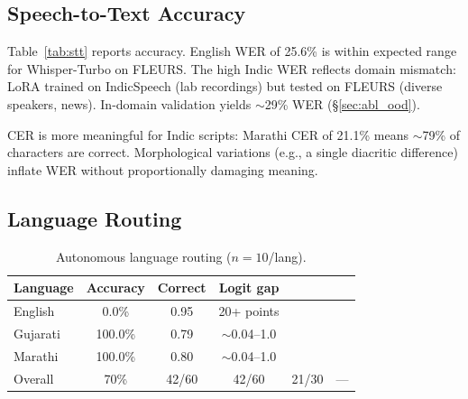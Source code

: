 \documentclass[11pt]{article}
\begin{document}
\subsection{Speech-to-Text Accuracy}

\begin{table}[t]
\centering\small
\caption{STT accuracy on FLEURS ($n{=}50$/language).}
\label{tab:stt}
\end{table}

Table~\ref{tab:stt} reports accuracy.  English WER of 25.6\% is within expected range for Whisper-Turbo on FLEURS.  The high Indic WER reflects domain mismatch: LoRA trained on IndicSpeech (lab recordings) but tested on FLEURS (diverse speakers, news).  In-domain validation yields $\sim$29\% WER (\S\ref{sec:abl_ood}).

CER is more meaningful for Indic scripts: Marathi CER of 21.1\% means $\sim$79\% of characters are correct.  Morphological variations (e.g., a single diacritic difference) inflate WER without proportionally damaging meaning.

\subsection{Language Routing}

\begin{table}[t]
\centering\small
\caption{Autonomous language routing ($n{=}10$/lang).}
\label{tab:routing}
\begin{tabular}{lccc}
\toprule
\textbf{Language} & \textbf{Accuracy} & \textbf{Correct} & \textbf{Logit gap} \\
\midrule
English  & 0.0\% & 0.95 & 20+ points \\
Gujarati & 100.0\% & 0.79 & $\sim$0.04--1.0 \\
Marathi  & 100.0\% & 0.80 & $\sim$0.04--1.0 \\
\midrule
Overall  & 70\% & 42/60 & 42/60  & 21/30 & --- \\
\bottomrule
\end{tabular}
\end{table}
\end{document}
